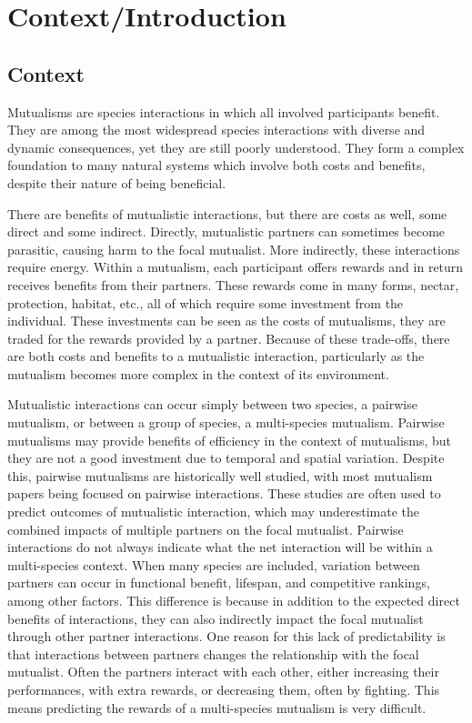 \documentclass[12pt,a4paper]{article}
\begin{document}
	
	\section*{Context/Introduction}
	\subsection*{Context}
	
	Mutualisms are species interactions in which all involved participants benefit. They are among the most widespread species interactions\cite{Chamberlain2014,Stachowicz2005,BoucherDouglasH.1985} with diverse and dynamic consequences, yet they are still poorly understood. They form a complex foundation to many natural systems which involve both costs and benefits, despite their nature of being beneficial. 
	
	There are benefits of mutualistic interactions, but there are costs as well, some direct and some indirect. Directly, mutualistic partners can sometimes become parasitic, causing harm to the focal mutualist\cite{Bronstein2001a}. More indirectly, these interactions require energy. Within a mutualism, each participant offers rewards and in return receives benefits from their partners. These rewards come in many forms, nectar, protection, habitat, etc., all of which require some investment from the individual\cite{Bronstein2001}. These investments can be seen as the costs of mutualisms, they are traded for the rewards provided by a partner. Because of these trade-offs, there are both costs and benefits to a mutualistic interaction\cite{Bronstein2001,Bronstein2001a}, particularly as the mutualism becomes more complex in the context of its environment. 
	
	Mutualistic interactions can occur simply between two species, a pairwise mutualism, or between a group of species, a multi-species mutualism\cite{Stanton2013}. Pairwise mutualisms may provide benefits of efficiency in the context of mutualisms, but they are not a good investment due to temporal and spatial variation\cite{Waser1996}. Despite this, pairwise mutualisms are historically well studied, with most mutualism papers being focused on pairwise interactions. These studies are often used to predict outcomes of mutualistic interaction, which may underestimate the combined impacts of multiple partners on the focal mutualist\cite{Stanton2013,Palmer2010}. Pairwise interactions do not always indicate what the net interaction will be within a multi-species context\cite{Chamberlain2014,Song2020}. When many species are included, variation between partners can occur in functional benefit, lifespan, and competitive rankings, among other factors\cite{Stanton2013}. This difference is because in addition to the expected direct benefits of interactions, they can also indirectly impact the focal mutualist through other partner interactions. One reason for this lack of predictability is that interactions between partners changes the relationship with the focal mutualist\cite{Afkhami2014}.  Often the partners interact with each other, either increasing their performances, with extra rewards, or decreasing them, often by fighting\cite{Boucher1982}. This means predicting the rewards of a multi-species mutualism is very difficult. 
	
\end{document}
